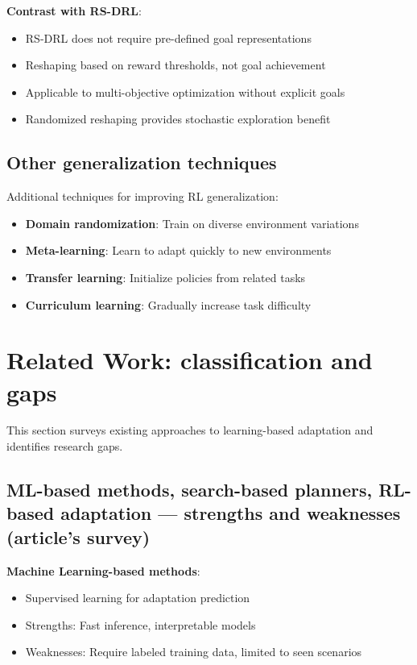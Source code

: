 \documentclass[11pt,a4paper]{article}
\begin{document}
\textbf{Contrast with RS-DRL}:
\begin{itemize}
    \item RS-DRL does not require pre-defined goal representations
    \item Reshaping based on reward thresholds, not goal achievement
    \item Applicable to multi-objective optimization without explicit goals
    \item Randomized reshaping provides stochastic exploration benefit
\end{itemize}

\subsection{Other generalization techniques}

Additional techniques for improving RL generalization:
\begin{itemize}
    \item \textbf{Domain randomization}: Train on diverse environment variations
    \item \textbf{Meta-learning}: Learn to adapt quickly to new environments
    \item \textbf{Transfer learning}: Initialize policies from related tasks
    \item \textbf{Curriculum learning}: Gradually increase task difficulty
\end{itemize}

\section{Related Work: classification and gaps}

This section surveys existing approaches to learning-based adaptation and identifies research gaps.

\subsection{ML-based methods, search-based planners, RL-based adaptation --- strengths and weaknesses (article's survey)}

\textbf{Machine Learning-based methods}:
\begin{itemize}
    \item Supervised learning for adaptation prediction
    \item Strengths: Fast inference, interpretable models
    \item Weaknesses: Require labeled training data, limited to seen scenarios
\end{itemize}
\end{document}
